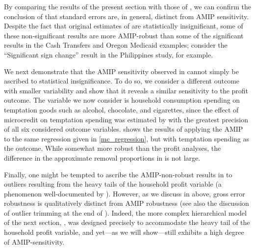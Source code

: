 By comparing the results of the present section with those of
, we can confirm the conclusion of
 that standard errors
are, in general, distinct from AMIP sensitivity.  Despite the fact that original
estimates of  are statistically insignificant, some
of these non-significant results are more AMIP-robust than some of the
significant results in the Cash Transfers and Oregon Medicaid examples; consider
the ``Significant sign change'' result in the Philippines study, for example.

We next demonstrate that the AMIP sensitivity observed in
 cannot simply be ascribed to statistical
insignificance. To do so, we consider a different outcome with smaller variability
and show that it reveals a similar sensitivity to the profit outcome.
The variable we now consider is household consumption spending on temptation goods such
as alcohol, chocolate, and cigarettes, since the effect of microcredit on
temptation spending was estimated by \citet{meager2019understanding} with the
greatest precision of all six considered outcome variables.
 shows the results of applying the AMIP to  the
same regression given in \eqref{mc_regression}, but with temptation spending as the outcome. While
somewhat more robust than the profit analyses, the difference in the approximate
removal proportions in  is not large.

Finally, one might be tempted to ascribe the AMIP-non-robust results in
 to outliers resulting from the heavy tails of the
household profit variable (a phenomenon well-documented by
\citet{meager2020aggregating}). However, as we discuss in
 above, gross error
robustness is qualitatively distinct from AMIP robustness (see also the
discussion of outlier trimming at the end of ).
Indeed, the more complex hierarchical model of the next section,
, was designed precisely to accommodate
the heavy tail of the household profit variable, and yet---as we will
show---still exhibits a high degree of AMIP-sensitivity.
